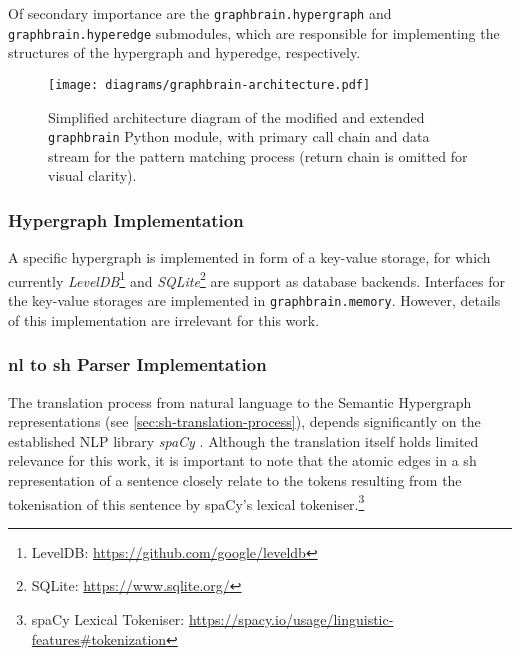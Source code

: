 \documentclass[11pt]{scrreprt}
\let\cite\parencite  %
\begin{document}
Of secondary importance are the \texttt{graphbrain.hypergraph} and \texttt{graphbrain.hyperedge} submodules, which are responsible for implementing the structures of the hypergraph and hyperedge, respectively.

\begin{figure}
\centering
\texttt{[image: diagrams/graphbrain-architecture.pdf]}
\caption{Simplified architecture diagram of the modified and extended \texttt{graphbrain} Python module, with primary call chain and data stream for the pattern matching process (return chain is omitted for visual clarity).}
\label{fig:graphbrain-architecture}
\end{figure}


\subsubsection{Hypergraph Implementation}
A specific hypergraph is implemented in form of a key-value storage, for which currently \textit{LevelDB}\footnote{LevelDB: \url{https://github.com/google/leveldb}} and \textit{SQLite}\footnote{SQLite: \url{https://www.sqlite.org/}} are support as database backends. Interfaces for the key-value storages are implemented in \texttt{graphbrain.memory}. However, details of this implementation are irrelevant for this work.


\subsubsection{\gls{nl} to \gls{sh} Parser Implementation}
\label{sec:nl-to-sh-parser-implementation}
The translation process from natural language to the Semantic Hypergraph representations (see \cref{sec:sh-translation-process}), depends significantly on the established NLP library \textit{spaCy} \cite{honnibal2020spacy}. Although the translation itself holds limited relevance for this work, it is important to note that the atomic edges in a \gls{sh} representation of a sentence closely relate to the tokens resulting from the tokenisation of this sentence by spaCy's lexical tokeniser.\footnote{spaCy Lexical Tokeniser: \url{https://spacy.io/usage/linguistic-features\#tokenization}}


%
%
\end{document}

